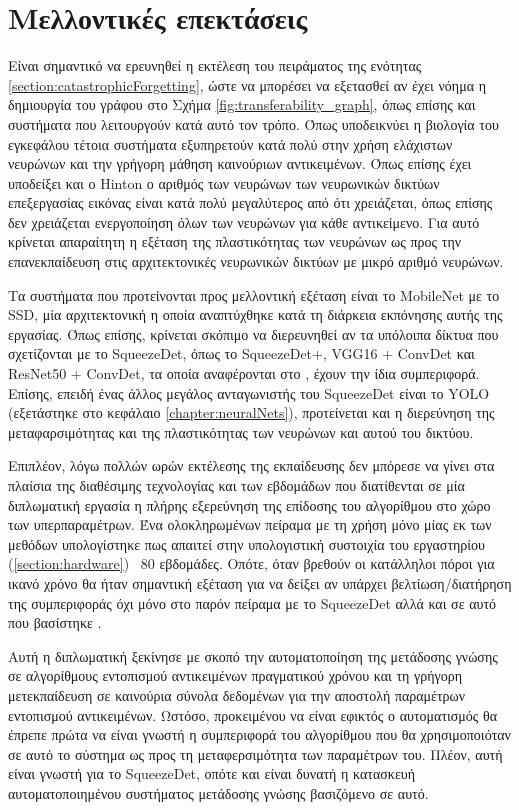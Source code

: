 \chapter{Μελλοντικές επεκτάσεις}
\label{chapter:futures}
Είναι σημαντικό να ερευνηθεί η εκτέλεση του πειράματος της ενότητας \ref{section:catastrophicForgetting}, ώστε να μπορέσει να εξετασθεί αν έχει νόημα η δημιουργία του γράφου στο Σχήμα \ref{fig:transferability_graph}, όπως επίσης και συστήματα που λειτουργούν κατά αυτό τον τρόπο. Όπως υποδεικνύει η βιολογία του εγκεφάλου τέτοια συστήματα εξυπηρετούν κατά πολύ στην χρήση ελάχιστων νευρώνων και την γρήγορη μάθηση καινούριων αντικειμένων. Όπως επίσης έχει υποδείξει και ο Hinton \cite{79} ο αριθμός των νευρώνων των νευρωνικών δικτύων επεξεργασίας εικόνας είναι κατά πολύ μεγαλύτερος από ότι χρειάζεται, όπως επίσης δεν χρειάζεται ενεργοποίηση όλων των νευρώνων για κάθε αντικείμενο. Για αυτό κρίνεται απαραίτητη η εξέταση της πλαστικότητας των νευρώνων ως προς την επανεκπαίδευση στις αρχιτεκτονικές νευρωνικών δικτύων με μικρό αριθμό νευρώνων.

Τα συστήματα που προτείνονται προς μελλοντική εξέταση είναι το MobileNet \cite{77} με το SSD, μία αρχιτεκτονική η οποία αναπτύχθηκε κατά τη διάρκεια εκπόνησης αυτής της εργασίας. Όπως επίσης, κρίνεται σκόπιμο να διερευνηθεί αν τα υπόλοιπα δίκτυα που σχετίζονται με το SqueezeDet, όπως το SqueezeDet+, VGG16 + ConvDet και ResNet50 + ConvDet, τα οποία αναφέρονται στο \cite{1}, έχουν την ίδια συμπεριφορά. Επίσης, επειδή ένας άλλος μεγάλος ανταγωνιστής του SqueezeDet είναι το YOLO (εξετάστηκε στο κεφάλαιο \ref{chapter:neuralNets}), προτείνεται και η διερεύνηση της μεταφαρσιμότητας και της πλαστικότητας των νευρώνων και αυτού του δικτύου.

Επιπλέον, λόγω πολλών ωρών εκτέλεσης της εκπαίδευσης δεν μπόρεσε να γίνει στα πλαίσια της διαθέσιμης τεχνολογίας και των εβδομάδων που διατίθενται σε μία διπλωματική εργασία η πλήρης εξερεύνηση της επίδοσης του αλγορίθμου στο χώρο των υπερπαραμέτρων. Ένα ολοκληρωμένων πείραμα με τη χρήση μόνο μίας εκ των μεθόδων υπολογίστηκε πως απαιτεί στην υπολογιστική συστοιχία του εργαστηρίου (\ref{section:hardware}) ~80 εβδομάδες. Οπότε, όταν βρεθούν οι κατάλληλοι πόροι για ικανό χρόνο θα ήταν σημαντική εξέταση για να δείξει αν υπάρχει βελτίωση/διατήρηση της συμπεριφοράς όχι μόνο στο παρόν πείραμα με το SqueezeDet αλλά και σε αυτό που βασίστηκε \cite{55}.

Αυτή η διπλωματική ξεκίνησε με σκοπό την αυτοματοποίηση της μετάδοσης γνώσης σε αλγορίθμους εντοπισμού αντικειμένων πραγματικού χρόνου και τη γρήγορη μετεκπαίδευση σε καινούρια σύνολα δεδομένων για την αποστολή παραμέτρων εντοπισμού αντικειμένων. Ωστόσο, προκειμένου να είναι εφικτός ο αυτοματισμός θα έπρεπε πρώτα να είναι γνωστή η συμπεριφορά του αλγορίθμου που θα χρησιμοποιόταν σε αυτό το σύστημα ως προς τη μεταφερσιμότητα των παραμέτρων του. Πλέον, αυτή είναι γνωστή για το SqueezeDet, οπότε και είναι δυνατή η κατασκευή αυτοματοποιημένου συστήματος μετάδοσης γνώσης βασιζόμενο σε αυτό. 

